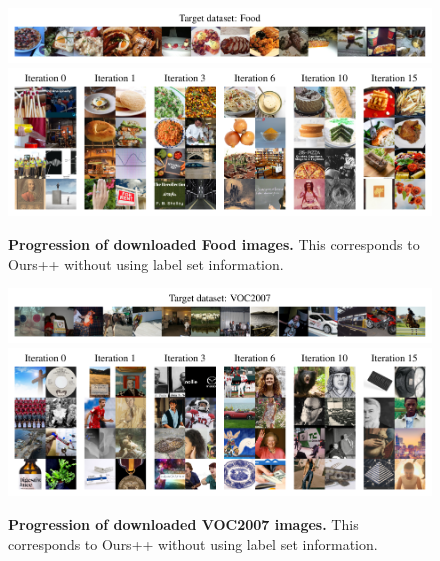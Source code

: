 \begin{figure}
    \centering
    \includegraphics{figures/food_targets.pdf} \\
    \vspace{-0.8em}
    \includegraphics{figures/food-progression-1148-2col.pdf}
    \caption{\textbf{Progression of downloaded Food images.} This corresponds to Ours++ without using label set information. }
    \label{fig:food_progression}
\end{figure}

\begin{figure}
    \centering
    \includegraphics{figures/voc_targets.pdf} \\
    \vspace{-0.8em}
    \includegraphics{figures/voc-progression-1156-2col.pdf}
    \caption{\textbf{Progression of downloaded VOC2007 images.} This corresponds to Ours++ without using label set information. }
    \label{fig:voc_progression}
\end{figure}


